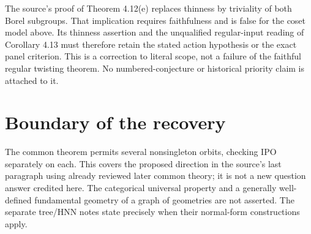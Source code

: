 The source's proof of Theorem 4.12(e) replaces thinness by triviality
of both Borel subgroups. That implication requires faithfulness and
is false for the coset model above. Its thinness assertion and the
unqualified regular-input reading of Corollary 4.13 must therefore
retain the stated action hypothesis or the exact panel criterion.
This is a correction to literal scope, not a failure of the faithful
regular twisting theorem. No numbered-conjecture or historical
priority claim is attached to it.

\section{Boundary of the recovery}
The common theorem permits several nonsingleton orbits, checking IPO
separately on each. This covers the proposed direction in the source's
last paragraph using already reviewed later common theory; it is
not a new question answer credited here. The categorical universal
property and a generally well-defined fundamental geometry of a
graph of geometries are not asserted. The separate tree/HNN notes
state precisely when their normal-form constructions apply.

